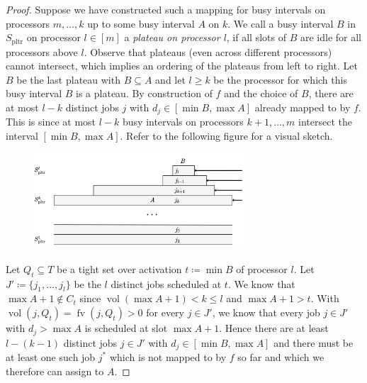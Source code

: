 \documentclass[a4paper]{article}
\DeclareMathOperator{\pltr}{pltr}
\DeclareMathOperator{\fv}{fv}
\DeclareMathOperator{\vol}{vol}
\begin{document}
\begin{proof}
  Suppose we have constructed such a mapping for busy intervals on processors $m, \ldots, k$ up to some busy interval $A$ on $k$.
  We call a busy interval $B$ in $S_{\pltr}$ on processor $l \in [m]$ a \emph{plateau on processor $l$}, if all slots of $B$ are idle for all processors above $l$.
  Observe that plateaus (even across different processors) cannot intersect, which implies an ordering of the plateaus from left to right.
  Let $B$ be the last plateau with $B \subseteq A$ and let $l \geq k$ be the processor for which this busy interval $B$ is a plateau.
  By construction of $f$ and the choice of $B$, there are at most $l - k$ distinct jobs $j$ with $d_j \in [\min B, \max A]$ already mapped to by $f$.
  This is since at most $l - k$ busy intervals on processors $k+1, \ldots, m$ intersect the interval $[\min B, \max A]$.
  Refer to the following figure for a visual sketch.
  \begin{figure}[H]
    \centering
    \includegraphics[width=0.7\textwidth]{graphics/running_time.jpg}
  \end{figure}
  Let $Q_t \subseteq T$ be a tight set over activation $t \coloneqq \min B$ of processor $l$.
  Let $J' \coloneqq \{ j_1, \ldots, j_{l} \}$ be the $l$ distinct jobs scheduled at $t$.
  We know that $\max A + 1 \notin C_t$ since $\vol(\max A + 1) < k \leq l$ and $\max A + 1 > t$.
  With $\vol(j, Q_t) = \fv(j, Q_t) > 0$ for every $j \in J'$, we know that every job $j \in J'$ with $d_j > \max A$ is scheduled at slot $\max A + 1$.
  Hence there are at least $l - (k-1)$ distinct jobs $j \in J'$ with $d_j \in [\min B, \max A]$ and there must be at least one such job $j^*$ which is not mapped to by $f$ so far and which we therefore can assign to $A$.
\end{proof}

\listoftodos{}
%


\end{document}
